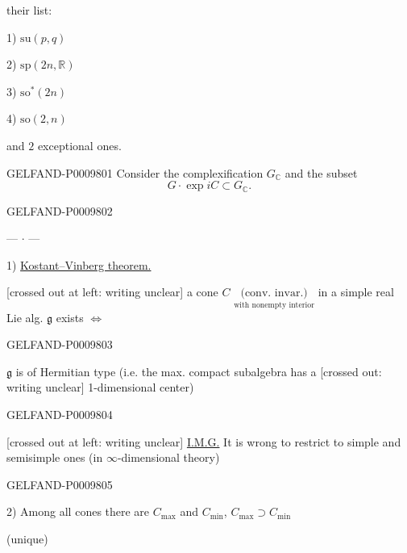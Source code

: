 their list:

1) $\mathrm{su}(p,q)$

2) $\mathrm{sp}(2n,\mathbb R)$

3) $\mathrm{so}^*(2n)$

4) $\mathrm{so}(2,n)$

and $2$ exceptional ones.

\begin{GelfandAdjacentEvidence}{GELFAND-P000980}{1}
Consider the complexification $G_{\mathbb C}$ and the subset
\[
 G\cdot\exp iC\subset G_{\mathbb C}.
\]
\end{GelfandAdjacentEvidence}
\begin{GelfandAdjacentEvidence}{GELFAND-P000980}{2}


\begin{center}--- \(\cdot\) ---\end{center}

1) \underline{Kostant–Vinberg theorem.}

[crossed out at left: writing unclear] a cone $C$
\(\underset{\text{with nonempty interior}}{\text{(conv. invar.)}}\)
in a simple real Lie alg. $\mathfrak g$ exists $\Leftrightarrow$
\end{GelfandAdjacentEvidence}
\begin{GelfandAdjacentEvidence}{GELFAND-P000980}{3}


$\mathfrak g$ is of Hermitian type (i.e. the max. compact subalgebra has a
[crossed out: writing unclear] 1-dimensional center)
\end{GelfandAdjacentEvidence}
\begin{GelfandAdjacentEvidence}{GELFAND-P000980}{4}


[crossed out at left: writing unclear] \underline{I.M.G.} It is wrong to restrict to simple and semisimple ones
(in $\infty$-dimensional theory)
\end{GelfandAdjacentEvidence}
\begin{GelfandAdjacentEvidence}{GELFAND-P000980}{5}


2) Among all cones there are $C_{\max}$ and $C_{\min}$,\quad
$C_{\max}\supset C_{\min}$

(unique)
\end{GelfandAdjacentEvidence}
